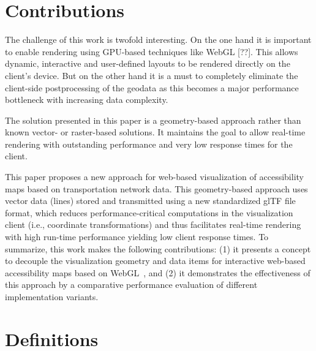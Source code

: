   \section{Contributions}
    The challenge of this work is twofold interesting. On the one hand it is important to enable rendering using GPU-based techniques like WebGL [??]. This allows dynamic, interactive and user-defined layouts to be rendered directly on the client's device. But on the other hand it is a must to completely eliminate the client-side postprocessing of the geodata as this becomes a major performance bottleneck with increasing data complexity.\par
    The solution presented in this paper is a geometry-based approach rather than known vector- or raster-based solutions. It maintains the goal to allow real-time rendering with outstanding performance and very low response times for the client.\par

    This paper proposes a new approach for web-based visualization of accessibility
    maps based on transportation network data. This geometry-based approach uses vector
    data (lines) stored and transmitted using a new standardized glTF file format, which
    reduces performance-critical computations in the visualization client (i.e., coordinate
    transformations) and thus facilitates real-time rendering with high run-time performance
    yielding low client response times. To summarize, this work makes the following contributions:
    (1) it presents a concept to decouple the visualization geometry and data items for
    interactive web-based accessibility maps based on Web\-GL~\cite{Jackson2016}, and (2)
    it demonstrates the effectiveness of this approach by a comparative performance
    evaluation of different implementation variants.\par
  \section{Definitions}
